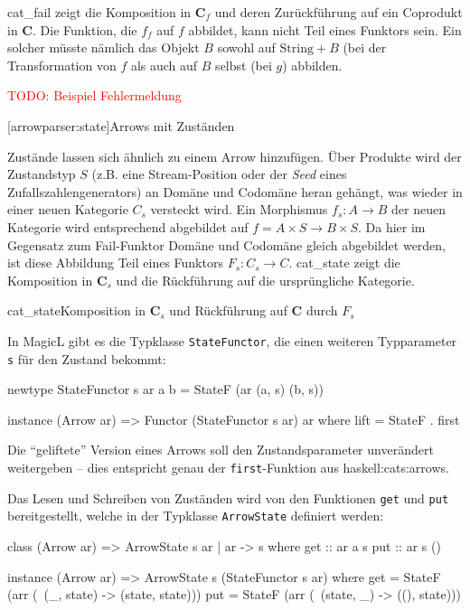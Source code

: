 \documentclass[12pt, a4paper, bibgerm]{scrbook}
\newenvironment{DIFnomarkup}{}{}
\newcommand\icode[1]{\lstinline?#1?}
\newcommand{\todo}[1]{
  \textcolor{red}{TODO: #1}
}
\newcommand\lsection{}
\newcommand\sref{}
\newcommand\abb{}
\newcommand\fig{}
\newcommand\ato{\rightarrow} %
\begin{document}
\abb{cat_fail} zeigt die Komposition in $\mathbf{C}_f$ und deren
Zurückführung auf ein Coprodukt in $\mathbf{C}$. Die Funktion, die $f_f$
auf $f$ abbildet, kann nicht Teil eines Funktors sein. Ein solcher
müsste nämlich das Objekt $B$ sowohl auf $\mathrm{String}+B$ (bei der
Transformation von $f$ als auch auf $B$ selbst (bei $g$) abbilden.

\todo{Beispiel Fehlermeldung}

\lsection[arrowparser:state]{Arrows mit Zuständen}

Zustände lassen sich ähnlich zu einem Arrow hinzufügen. Über Produkte
wird der Zustandstyp $S$ (z.B. eine Stream-Position oder der
\textit{Seed} eines Zufallszahlengenerators) an Domäne und Codomäne
heran gehängt, was wieder in einer neuen Kategorie $C_{s}$ versteckt
wird. Ein Morphismus $f_{s} : A \rightarrow B$ der neuen Kategorie
wird entsprechend abgebildet auf $f = A \times S \rightarrow B \times
S$. Da hier im Gegensatz zum Fail-Funktor Domäne und Codomäne gleich
abgebildet werden, ist diese Abbildung Teil eines Funktors $F_s: C_{s}
\ato C$. \abb{cat_state} zeigt die Komposition in $\mathbf{C}_s$ und die
Rückführung auf die ursprüngliche Kategorie.

\fig{cat_state}{Komposition in $\mathbf{C}_s$ und Rückführung auf
  $\mathbf{C}$ durch $F_s$}

In MagicL gibt es die Typklasse \icode{StateFunctor}, die einen weiteren
Typparameter \icode{s} für den Zustand bekommt:

\begin{DIFnomarkup}\begin{code}
newtype StateFunctor s ar a b = StateF (ar (a, s) (b, s))

instance (Arrow ar) => Functor (StateFunctor s ar) ar where
    lift = StateF . first
\end{code}\end{DIFnomarkup} %

Die "`geliftete"' Version eines Arrows soll den Zustandsparameter
unverändert weitergeben -- dies entspricht genau der
\icode{first}-Funktion aus \sref{haskell:cats:arrows}.

Das Lesen und Schreiben von Zuständen wird von den Funktionen \icode{get} und
\icode{put} bereitgestellt, welche in der Typklasse \icode{ArrowState}
definiert werden:

\begin{DIFnomarkup}\begin{code}
class (Arrow ar) => ArrowState s ar | ar -> s where
  get :: ar a s
  put :: ar s ()

instance (Arrow ar) => ArrowState s (StateFunctor s ar)
  where
    get = StateF (arr (\ (_, state) -> (state, state)))
    put = StateF (arr (\ (state, _) -> ((), state)))
\end{code}\end{DIFnomarkup}
\end{document}
